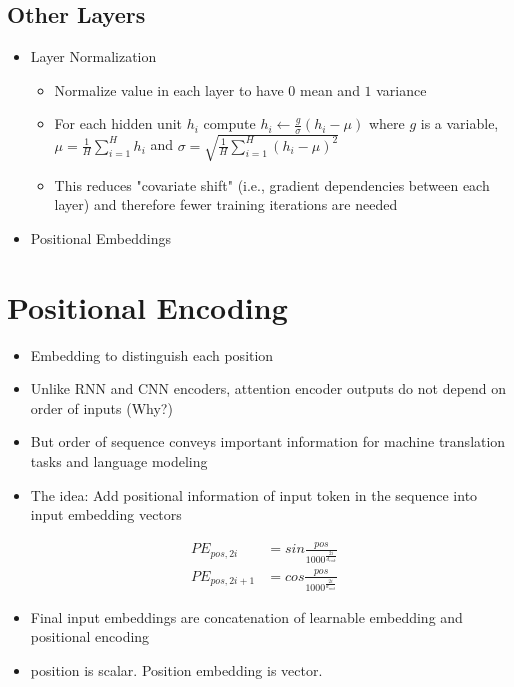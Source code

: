 \documentclass{article}
\begin{document}
\subsection{Other Layers}
\begin{itemize}
    \item Layer Normalization
    \begin{itemize}
        \item Normalize value in each layer to have $0$ mean and $1$ variance
        \item For each hidden unit $h_i$ compute $h_i \leftarrow  \frac{g}{\sigma} (h_i - \mu)$ where $g$ is a variable, $\mu = \frac{1}{H} \sum_{i=1}^H h_i$ and $\sigma = \sqrt{\frac{1}{H} \sum_{i=1}^H (h_i - \mu)^2 }$
        \item This reduces "covariate shift" (i.e., gradient dependencies between each layer) and therefore fewer training iterations are needed
    \end{itemize}
    \item Positional Embeddings
\end{itemize}
\section{Positional Encoding}
\begin{itemize}
    \item Embedding to distinguish each position
    \item Unlike RNN and CNN encoders, attention encoder outputs do not depend on order of inputs (Why?)
    \item But order of sequence conveys important information for machine translation tasks and language modeling
    \item The idea: Add positional information of input token in the sequence into input embedding vectors
\end{itemize}
\begin{align*}
    &PE_{pos,2i}   &= sin \frac{pos}{1000^{\frac{2i}{d_{emb}}}} \\
    &PE_{pos,2i+1} &= cos \frac{pos}{1000^{\frac{2i}{d_{emb}}}}
\end{align*}
\begin{itemize}
    \item Final input embeddings are concatenation of learnable embedding and positional encoding
    \item position is scalar. Position embedding is vector.
\end{itemize}
\end{document}
